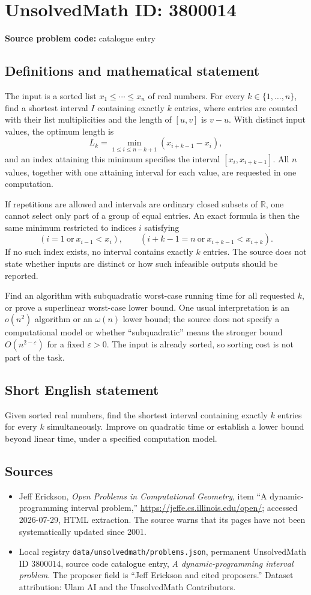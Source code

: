 \documentclass[11pt]{article}
\begin{document}
\section*{UnsolvedMath ID: 3800014}
\textbf{Source problem code:} catalogue entry
\subsection{Definitions and mathematical statement}
The input is a sorted list $x_1\leq\cdots\leq x_n$ of real numbers. For every $k\in\{1,\ldots,n\}$, find a shortest interval $I$ containing exactly $k$ entries, where entries are counted with their list multiplicities and the length of $[u,v]$ is $v-u$. With distinct input values, the optimum length is
\[
L_k=\min_{1\leq i\leq n-k+1}(x_{i+k-1}-x_i),
\]
and an index attaining this minimum specifies the interval $[x_i,x_{i+k-1}]$. All $n$ values, together with one attaining interval for each value, are requested in one computation.

If repetitions are allowed and intervals are ordinary closed subsets of $\mathbb R$, one cannot select only part of a group of equal entries. An exact formula is then the same minimum restricted to indices $i$ satisfying
\[
(i=1\ \text{or}\ x_{i-1}<x_i),\qquad
(i+k-1=n\ \text{or}\ x_{i+k-1}<x_{i+k}).
\]
If no such index exists, no interval contains exactly $k$ entries. The source does not state whether inputs are distinct or how such infeasible outputs should be reported.

Find an algorithm with subquadratic worst-case running time for all requested $k$, or prove a superlinear worst-case lower bound. One usual interpretation is an $o(n^2)$ algorithm or an $\omega(n)$ lower bound; the source does not specify a computational model or whether ``subquadratic'' means the stronger bound $O(n^{2-\varepsilon})$ for a fixed $\varepsilon>0$. The input is already sorted, so sorting cost is not part of the task.
\subsection{Short English statement}
Given sorted real numbers, find the shortest interval containing exactly $k$ entries for every $k$ simultaneously. Improve on quadratic time or establish a lower bound beyond linear time, under a specified computation model.
\subsection{Sources}
\begin{itemize}
\item Jeff Erickson, \emph{Open Problems in Computational Geometry}, item ``A dynamic-programming interval problem,'' \url{https://jeffe.cs.illinois.edu/open/}; accessed 2026-07-29, HTML extraction. The source warns that its pages have not been systematically updated since 2001.
\item Local registry \texttt{data/unsolvedmath/problems.json}, permanent UnsolvedMath ID $3800014$, source code catalogue entry, \emph{A dynamic-programming interval problem}. The proposer field is ``Jeff Erickson and cited proposers.'' Dataset attribution: Ulam AI and the UnsolvedMath Contributors.
\end{itemize}
\end{document}
